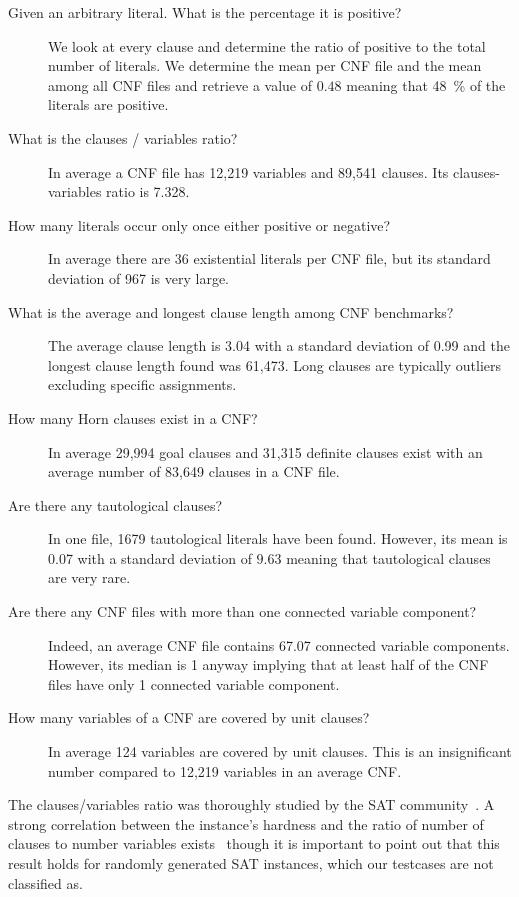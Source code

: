 \begin{description}
\item[Given an arbitrary literal. What is the percentage it is positive?]
  We look at every clause and determine the ratio of positive to the total number of literals.
  We determine the mean per CNF file and the mean among all CNF files
  and retrieve a value of $0.48$ meaning that 48~\% of the literals are positive.
\item[What is the clauses / variables ratio?]
  In average a CNF file has 12,219 variables and 89,541 clauses.
  Its clauses-variables ratio is 7.328.
\item[How many literals occur only once either positive or negative?]
  In average there are 36 existential literals per CNF file,
  but its standard deviation of 967 is very large.
\item[What is the average and longest clause length among CNF benchmarks?]
  The average clause length is 3.04 with a standard deviation of 0.99
  and the longest clause length found was 61,473. Long clauses are typically
  outliers excluding specific assignments.
\item[How many Horn clauses exist in a CNF?]
  In average 29,994 goal clauses and 31,315 definite clauses exist
  with an average number of 83,649 clauses in a CNF file.
\item[Are there any tautological clauses?]
  In one file, 1679 tautological literals have been found. However,
  its mean is 0.07 with a standard deviation of $9.63$ meaning that tautological
  clauses are very rare.
\item[Are there any CNF files with more than one connected variable component?]
  Indeed, an average CNF file contains 67.07 connected variable components.
  However, its median is 1 anyway implying that at least half of the CNF files
  have only 1 connected variable component.
\item[How many variables of a CNF are covered by unit clauses?]
  In average 124 variables are covered by unit clauses. This is an insignificant
  number compared to 12,219 variables in an average CNF.
\end{description}

The clauses/variables ratio was thoroughly studied by the SAT
community~\cite{nudelman2004understanding}.
A strong correlation between the instance's hardness and the ratio of number
of clauses to number variables exists~\cite{selman1996generating}
though it is important to point out that this result holds for randomly
generated SAT instances, which our testcases are not classified as.

